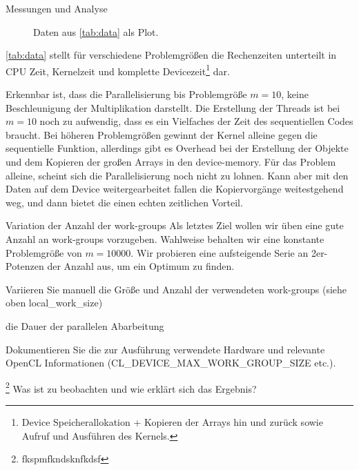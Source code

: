 \documentclass[
ngerman,
subtask=ruled %
]{tudaexercise}
\begin{document}
\begin{task}{Messungen und Analyse}
\begin{figure}[H]
			\caption{Daten aus \autoref{tab:data} als Plot.}
		\end{figure}
		
		\autoref{tab:data} stellt für verschiedene Problemgrößen die Rechenzeiten unterteilt in CPU Zeit, Kernelzeit und komplette Devicezeit\footnote{Device Speicherallokation + Kopieren der Arrays hin und zurück sowie Aufruf und Ausführen des Kernels.} dar.
	
		Erkennbar ist, dass die Parallelisierung bis Problemgröße $m=10$, keine Beschleunigung der Multiplikation darstellt.
		Die Erstellung der Threads ist bei $m=10$ noch zu aufwendig, dass es ein Vielfaches der Zeit des sequentiellen Codes braucht.
		Bei höheren Problemgrößen gewinnt der Kernel alleine gegen die sequentielle Funktion, allerdings gibt es Overhead bei der Erstellung der Objekte und dem Kopieren der großen Arrays in den device-memory.
		Für das Problem alleine, scheint sich die Parallelisierung noch nicht zu lohnen.
		Kann aber mit den Daten auf dem Device weitergearbeitet fallen die Kopiervorgänge weitestgehend weg, und dann bietet die einen echten zeitlichen Vorteil.
		
		
		
		
	\end{task}

	\begin{task} {Variation der Anzahl der work-groups}
		Als letztes Ziel wollen wir üben eine gute Anzahl an work-groups vorzugeben. Wahlweise behalten wir eine konstante Problemgröße von $m = 10000$.
		Wir probieren eine aufsteigende Serie an 2er-Potenzen der Anzahl aus, um ein Optimum zu finden.
		
		Variieren Sie manuell die Größe und Anzahl der verwendeten work-groups (siehe oben local\_work\_size) 
		
		die Dauer der parallelen Abarbeitung
		
		Dokumentieren Sie die zur Ausführung verwendete Hardware und relevante OpenCL Informationen (CL\_DEVICE\_MAX\_WORK\_GROUP\_SIZE etc.).
		
		\footnote{fkspmfkndsknfkdsf}
		Was ist zu beobachten und wie erklärt sich das Ergebnis?
		
		
	\end{task}


	
	
\end{document}

